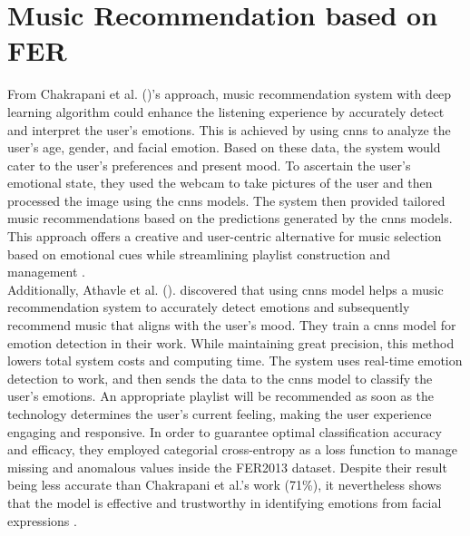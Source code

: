 \section{Music Recommendation based on FER}
From Chakrapani et al. (\citeyear{mrchakrapanids_2023_music})'s approach, music recommendation system with deep learning algorithm could enhance the listening experience by accurately detect and interpret the user's emotions.
This is achieved by using \gls{cnns} to analyze the user's age, gender, and facial emotion. Based on these data, the system would cater to the user's preferences and present mood.
To ascertain the user's emotional state, they used the webcam to take pictures of the user and then processed the image using the \gls{cnns} models.
The system then provided tailored music recommendations based on the predictions generated by the \gls{cnns} models. 
This approach offers a creative and user-centric alternative for music selection based on emotional cues while streamlining playlist construction and management \citep{mrchakrapanids_2023_music}.
\\
\indent Additionally, Athavle et al. (\citeyear{athavle_2021_music}). discovered that using \gls{cnns} model helps a music recommendation system to accurately detect emotions and subsequently recommend music that aligns with the user's mood.
They train a \gls{cnns} model for emotion detection in their work. 
While maintaining great precision, this method lowers total system costs and computing time.
The system uses real-time emotion detection to work, and then sends the data to the \gls{cnns} model to classify the user's emotions. 
An appropriate playlist will be recommended as soon as the technology determines the user's current feeling, making the user experience engaging and responsive.
In order to guarantee optimal classification accuracy and efficacy, they employed categorial cross-entropy as a loss function to manage missing and anomalous values inside the FER2013 dataset.
Despite their result being less accurate than Chakrapani et al.'s work (71\%), it nevertheless shows that the model is effective and trustworthy in identifying emotions from facial expressions \citep{athavle_2021_music}.
